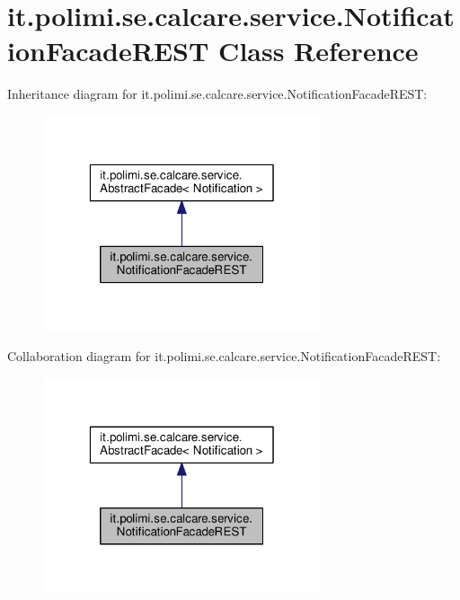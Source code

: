 \hypertarget{classit_1_1polimi_1_1se_1_1calcare_1_1service_1_1NotificationFacadeREST}{}\section{it.\+polimi.\+se.\+calcare.\+service.\+Notification\+Facade\+R\+E\+S\+T Class Reference}
\label{classit_1_1polimi_1_1se_1_1calcare_1_1service_1_1NotificationFacadeREST}


Inheritance diagram for it.\+polimi.\+se.\+calcare.\+service.\+Notification\+Facade\+R\+E\+S\+T\+:
\nopagebreak
\begin{figure}[H]
\begin{center}
\leavevmode
\includegraphics[width=232pt]{classit_1_1polimi_1_1se_1_1calcare_1_1service_1_1NotificationFacadeREST__inherit__graph}
\end{center}
\end{figure}


Collaboration diagram for it.\+polimi.\+se.\+calcare.\+service.\+Notification\+Facade\+R\+E\+S\+T\+:
\nopagebreak
\begin{figure}[H]
\begin{center}
\leavevmode
\includegraphics[width=232pt]{classit_1_1polimi_1_1se_1_1calcare_1_1service_1_1NotificationFacadeREST__coll__graph}
\end{center}
\end{figure}
